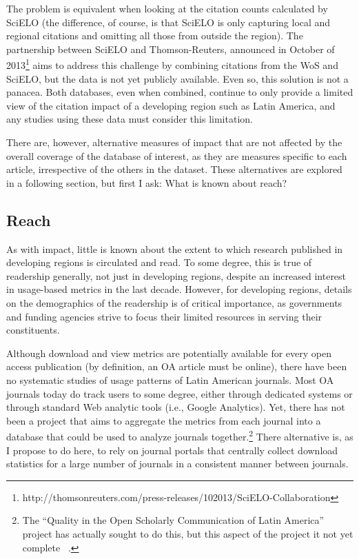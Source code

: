 The problem is equivalent when looking at the citation counts calculated by SciELO (the difference, of course, is that SciELO is only capturing local and regional citations and omitting all those from outside the region). The partnership between SciELO and Thomson-Reuters, announced in October of 2013\footnote{http:\slash \slash thomsonreuters.com\slash press-releases\slash 102013\slash SciELO-Collaboration} aims to address this challenge by combining citations from the WoS and SciELO, but the data is not yet publicly available. Even so, this solution is not a panacea. Both databases, even when combined, continue to only provide a limited view of the citation impact of a developing region such as Latin America, and any studies using these data must consider this limitation.

There are, however, alternative measures of impact that are not affected by the overall coverage of the database of interest, as they are measures specific to each article, irrespective of the others in the dataset. These alternatives are explored in a following section, but first I ask: What is known about reach?

\subsection{Reach}
\label{reach}

As with impact, little is known about the extent to which research published in developing regions is circulated and read. To some degree, this is true of readership generally, not just in developing regions, despite an increased interest in usage-based metrics in the last decade. However, for developing regions, details on the demographics of the readership is of critical importance, as governments and funding agencies strive to focus their limited resources in serving their constituents.

Although download and view metrics are potentially available for every open access publication (by definition, an OA article must be online), there have been no systematic studies of usage patterns of Latin American journals. Most OA journals today do track users to some degree, either through dedicated systems or through standard Web analytic tools (i.e., Google Analytics). Yet, there has not been a project that aims to aggregate the metrics from each journal into a database that could be used to analyze journals together.\footnote{The ``Quality in the Open Scholarly Communication of Latin America'' project has actually sought to do this, but this aspect of the project it not yet complete ~\citep{Alperin2013e}.} There alternative is, as I propose to do here, to rely on journal portals that centrally collect download statistics for a large number of journals in a consistent manner between journals.

